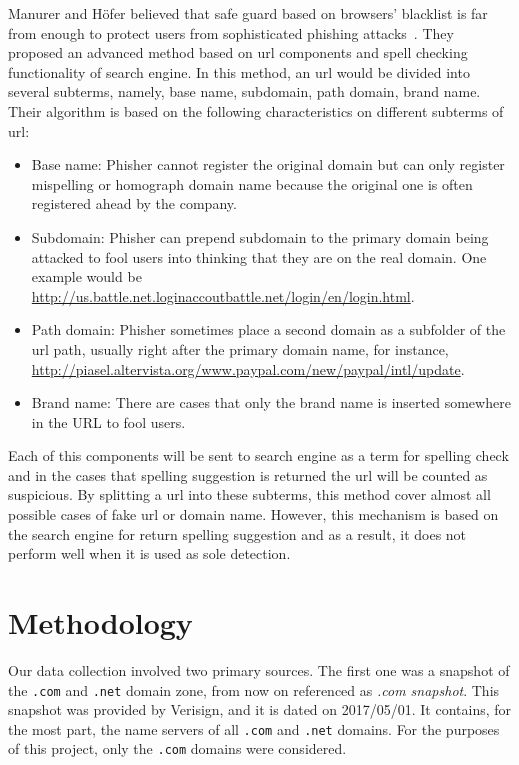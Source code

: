 \documentclass[letterpaper,twocolumn,10pt]{article}
\begin{document}
Manurer and Höfer believed that safe guard based on browsers' blacklist is far from enough to protect users from sophisticated phishing attacks~\cite{proc-eds-2012}.
They proposed an advanced method based on url components and spell checking functionality of search engine.
In this method, an url would be divided into several subterms, namely, base name, subdomain, path domain, brand name.
Their algorithm is based on the following characteristics on different subterms of url:
\begin{itemize}
  \item Base name: Phisher cannot register the original domain but can only register mispelling or homograph domain name because the original one is often registered ahead by the company.
  \item Subdomain: Phisher can prepend subdomain to the primary domain being attacked to fool users into thinking that they are on the real domain. One example would be \url{http://us.battle.net.loginaccoutbattle.net/login/en/login.html}.
  \item Path domain: Phisher sometimes place a second domain as a subfolder of the url path, usually right after the primary domain name, for instance, \url{http://piasel.altervista.org/www.paypal.com/new/paypal/intl/update}.
  \item Brand name: There are cases that only the brand name is inserted somewhere in the URL to fool users.
\end{itemize}
Each of this components will be sent to search engine as a term for spelling check and in the cases that spelling suggestion is returned the url will be counted as suspicious.
By splitting a url into these subterms, this method cover almost all possible cases of fake url or domain name.
However, this mechanism is based on the search engine for return spelling suggestion and as a result, it does not perform well when it is used as sole detection.


\section{Methodology}
Our data collection involved two primary sources.
The first one was a snapshot of the \texttt{.com} and \texttt{.net} domain zone, from now on referenced as \textit{.com snapshot}.
This snapshot was provided by Verisign, and it is dated on 2017/05/01.
It contains, for the most part, the name servers of all \texttt{.com} and \texttt{.net} domains.
For the purposes of this project, only the \texttt{.com} domains were considered.
\end{document}
